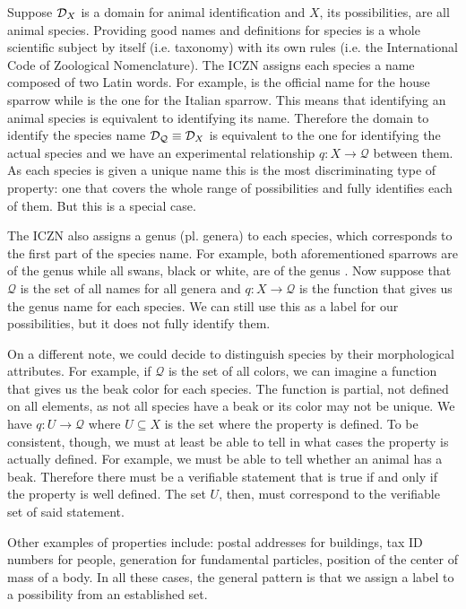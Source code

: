 Suppose $\mathcal{D}_X$ is a domain for animal identification and $X$, its possibilities, are all animal species. Providing good names and definitions for species is a whole scientific subject by itself (i.e. taxonomy) with its own rules (i.e. the International Code of Zoological Nomenclature). The ICZN assigns each species a name composed of two Latin words. For example,  is the official name for the house sparrow while  is the one for the Italian sparrow. This means that identifying an animal species is equivalent to identifying its name. Therefore the domain to identify the species name $\mathcal{D}_{\mathcal{Q}} \equiv \mathcal{D}_X$ is equivalent to the one for identifying the actual species and we have an experimental relationship $q: X \to \mathcal{Q}$ between them. As each species is given a unique name this is the most discriminating type of property: one that covers the whole range of possibilities and fully identifies each of them. But this is a special case.

The ICZN also assigns a genus (pl. genera) to each species, which corresponds to the first part of the species name. For example, both aforementioned sparrows are of the genus  while all swans, black or white, are of the genus . Now suppose that $\mathcal{Q}$ is the set of all names for all genera and $q: X \to \mathcal{Q}$ is the function that gives us the genus name for each species. We can still use this as a label for our possibilities, but it does not fully identify them.

On a different note, we could decide to distinguish species by their morphological attributes. For example, if $\mathcal{Q}$ is the set of all colors, we can imagine a function that gives us the beak color for each species. The function is partial, not defined on all elements, as not all species have a beak or its color may not be unique. We have $q: U \to \mathcal{Q}$ where $U \subseteq X$ is the set where the property is defined. To be consistent, though, we must at least be able to tell in what cases the property is actually defined. For example, we must be able to tell whether an animal has a beak. Therefore there must be a verifiable statement that is true if and only if the property is well defined. The set $U$, then, must correspond to the verifiable set of said statement.

Other examples of properties include: postal addresses for buildings, tax ID numbers for people, generation for fundamental particles, position of the center of mass of a body. In all these cases, the general pattern is that we assign a label to a possibility from an established set.

